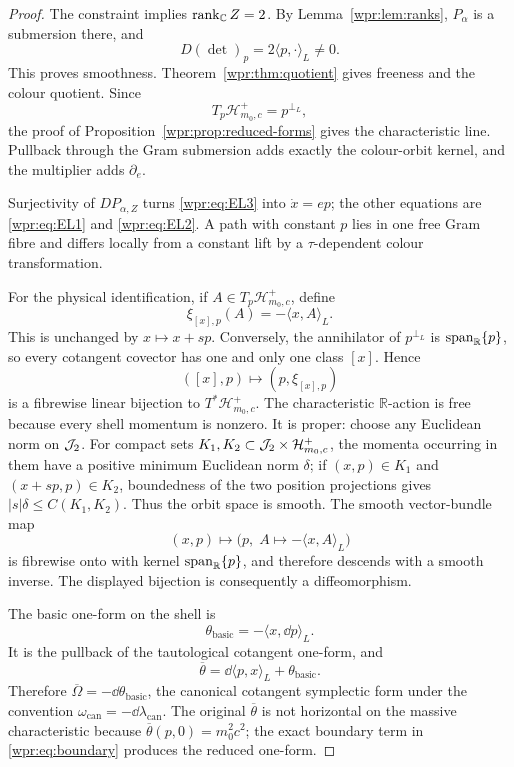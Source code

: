 \begin{proof}
The constraint implies \(\operatorname{rank}_{\mathbb C} Z=2\).  By
Lemma~\ref{wpr:lem:ranks}, \(P_\alpha\) is a submersion there, and
\[
 D(\det)_p=2\langle p,\mathord{\cdot}\rangle_L\neq0.
\]
This proves smoothness.  Theorem~\ref{wpr:thm:quotient} gives freeness
and the colour quotient.  Since
\[
 T_p\mathcal H^+_{m_0,c}=p^{\perp_L},
\]
the proof of Proposition~\ref{wpr:prop:reduced-forms} gives the
characteristic line.  Pullback through the Gram submersion adds exactly
the colour-orbit kernel, and the multiplier adds \(\partial_e\).

Surjectivity of \(D P_{\alpha,Z}\) turns \eqref{wpr:eq:EL3} into
\(\dot x=e p\); the other equations are \eqref{wpr:eq:EL1} and
\eqref{wpr:eq:EL2}.  A path with constant \(p\) lies in one free Gram
fibre and differs locally from a constant lift by a
\(\tau\)-dependent colour transformation.

For the physical identification, if
\(A\in T_p\mathcal H^+_{m_0,c}\), define
\[
 \xi_{[x],p}(A)=-\langle x,A\rangle_L.
\]
This is unchanged by \(x\mapsto x+s p\).  Conversely, the annihilator
of \(p^{\perp_L}\) is \(\operatorname{span}_{\mathbb R}\{p\}\), so every cotangent covector has
one and only one class \([x]\).  Hence
\[
 ([x],p)\longmapsto(p,\xi_{[x],p})
\]
is a fibrewise linear bijection to \(T^*\mathcal H^+_{m_0,c}\).
The characteristic \(\mathbb R\)-action is free because every shell
momentum is nonzero.  It is proper: choose any Euclidean norm on
\(\mathcal J_2\).  For compact sets \(K_1,K_2\subset
\mathcal J_2\times\mathcal H^+_{m_0,c}\), the momenta occurring in them have a
positive minimum Euclidean norm \(\delta\); if
\((x,p)\in K_1\) and \((x+s p,p)\in K_2\), boundedness of the two
position projections gives \(|s|\delta\leq C(K_1,K_2)\).
Thus the orbit space is smooth.  The smooth vector-bundle map
\[
 (x,p)\longmapsto
 \bigl(p,\;A\mapsto-\langle x,A\rangle_L\bigr)
\]
is fibrewise onto with kernel \(\operatorname{span}_{\mathbb R}\{p\}\), and therefore descends
with a smooth inverse.  The displayed bijection is consequently a
diffeomorphism.

The basic one-form on the shell is
\begin{equation}
 \theta_{\mathrm{basic}}=-\langle x,\dd p\rangle_L.
 \label{wpr:eq:basic}
\end{equation}
It is the pullback of the tautological cotangent one-form, and
\begin{equation}
 \overline\theta
 =\dd\langle p,x\rangle_L+\theta_{\mathrm{basic}}.
 \label{wpr:eq:boundary}
\end{equation}
Therefore
\(\overline\Omega=-\dd\theta_{\mathrm{basic}}\), the canonical
cotangent symplectic form under the convention
\(\omega_{\mathrm{can}}=-\dd\lambda_{\mathrm{can}}\).
The original \(\overline\theta\) is not horizontal on the massive
characteristic because \(\overline\theta(p,0)=m_0^2c^2\); the exact
boundary term in \eqref{wpr:eq:boundary} produces the reduced
one-form.


\end{proof}
